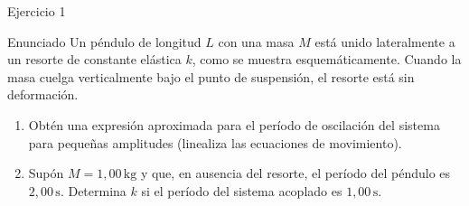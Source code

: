 \documentclass[
    10pt,
    aspectratio=169,
    xcolor={dvipsnames},
    spanish,
    ]{beamer}
\begin{document}
\begin{frame}{Ejercicio 1}
\begin{block}{Enunciado}
  \footnotesize
  Un péndulo de longitud $L$ con una masa $M$ está unido lateralmente a un resorte de constante elástica $k$, como se muestra esquemáticamente. Cuando la masa cuelga verticalmente bajo el punto de suspensión, el resorte está sin deformación.
\begin{enumerate}
  \item Obtén una expresión aproximada para el período de oscilación del sistema para pequeñas amplitudes (linealiza las ecuaciones de movimiento).
  \item Supón $M=1{,}00\,\mathrm{kg}$ y que, en ausencia del resorte, el período del péndulo es $2{,}00\,\mathrm{s}$. Determina $k$ si el período del sistema acoplado es $1{,}00\,\mathrm{s}$.
\end{enumerate}

\begin{center}
\end{center}
\end{block}
\end{frame}
\end{document}
